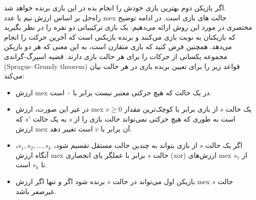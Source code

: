 \begin{solution}
	اگر بازیکن دوم بهترین بازی خودش را انجام بده در این بازی برنده خواهد شد.\\[0.2cm]
	
راه‌حل بر اساس ارزش نیم یا عدد mex حالت های بازی است. در ادامه توضیح مختصری در مورد این روش ارائه می‌دهیم: یک بازی ترکیبیاتی دو نفره را در نظر بگیرید که بازیکنان به نوبت بازی می‌کنند و برنده بازیکنی است که آخرین حرکت را انجام می‌دهد. همچنین فرض کنید که بازی متقارن است، به این معنی که هر دو بازیکن مجموعه یکسانی از حرکات را برای هر حالت بازی دارند.  قضیه اسپرگ-گراندی (Sprague–Grundy theorem) قواعد زیر را برای تعیین برنده بازی در هر حالت بیان می‌کند:
	\begin{itemize}

	\item ارزش mex  در یک حالت که هیچ حرکتی معتبر نیست برابر با ۰ است.
	\item در غیر این صورت، ارزش mex یک حالت $s$ از بازی برابر با کوچک‌ترین مقدار $v \geq 0$ است به طوری که هیچ حرکتی نمی‌تواند حالت بازی را از $s$ به یک حالت $s'$ که ارزش mex آن برابر با $v$ است تغییر دهد.
	\item اگر یک حالت $s$ از بازی بتواند به چندین حالت مستقل تقسیم شود، $s_1, s_2, \ldots, s_k$، آنگاه ارزش mex حالت $s$ برابر با عملگر یای انحصاری (xor) ارزش‌های mex از $s_1$ تا $s_k$ است.
	\item بازیکن اول می‌تواند در حالت $s$ برنده شود اگر و تنها اگر ارزش mex حالت $s$ غیرصفر باشد.

	\end{itemize}
	

\end{solution}

